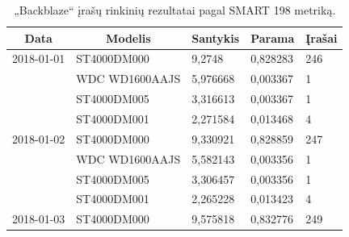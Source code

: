 \documentclass{VUMIFPSkursinis}
\begin{document}
\begin{table}[H]
\centering
\caption{„Backblaze“ įrašų rinkinių rezultatai pagal SMART 198 metriką.}
\label{tab:rez198}
{\begin{tabular}{|l|l|l|l|l|}
\hline
\multicolumn{1}{|c|}{\textbf{Data}} & \multicolumn{1}{c|}{\textbf{Modelis}} & \multicolumn{1}{c|}{\textbf{Santykis}} & \multicolumn{1}{c|}{\textbf{Parama}} & \multicolumn{1}{c|}{\textbf{Įrašai}} \\ \hline
2018-01-01                          & ST4000DM000                           & 9,2748                                 & 0,828283                             & 246                                  \\ \hline
\cellcolor[HTML]{C0C0C0}            & WDC WD1600AAJS                        & 5,976668                               & 0,003367                             & 1                                    \\ \hline
\cellcolor[HTML]{C0C0C0}            & ST4000DM005                           & 3,316613                               & 0,003367                             & 1                                    \\ \hline
\cellcolor[HTML]{C0C0C0}            & ST4000DM001                           & 2,271584                               & 0,013468                             & 4                                    \\ \hline
2018-01-02                          & ST4000DM000                           & 9,330921                               & 0,828859                             & 247                                  \\ \hline
\cellcolor[HTML]{C0C0C0}            & WDC WD1600AAJS                        & 5,582143                               & 0,003356                             & 1                                    \\ \hline
\cellcolor[HTML]{C0C0C0}            & ST4000DM005                           & 3,306457                               & 0,003356                             & 1                                    \\ \hline
\cellcolor[HTML]{C0C0C0}            & ST4000DM001                           & 2,265228                               & 0,013423                             & 4                                    \\ \hline
2018-01-03                          & ST4000DM000                           & 9,575818                               & 0,832776                             & 249                                  \\ \hline

\end{tabular}}
\end{table}
\end{document}
